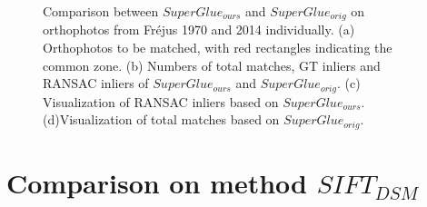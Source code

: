 \begin{figure}[htbp]
\begin{center}
{\begin{minipage}[t]{0.48\linewidth}
			\end{minipage}%
		}
		\caption{Comparison between $SuperGlue_{ours}$ and $SuperGlue_{orig}$ on orthophotos from Fr{\'e}jus 1970 and 2014 individually. (a) Orthophotos to be matched, with red rectangles indicating the common zone. (b) Numbers of total matches, GT inliers and RANSAC inliers of $SuperGlue_{ours}$ and $SuperGlue_{orig}$. (c) Visualization of RANSAC inliers based on $SuperGlue_{ours}$. (d)Visualization of total matches based on $SuperGlue_{orig}$.}
		\label{Match result}
	\end{center}
\end{figure} 

\section{Comparison on method $SIFT_{DSM}$}

